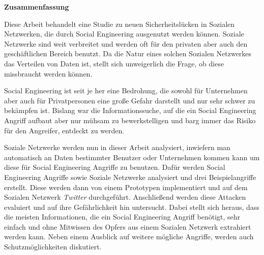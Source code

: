 
\clearemptydoublepage
{}
{}


\vspace*{2cm}
\begin{center}
{\Large \bf Zusammenfassung}
\end{center}
\vspace{1cm}

Diese Arbeit behandelt eine Studie zu neuen Sicherheitslücken in Sozialen
Netzwerken, die durch Social Engineering ausgenutzt werden können. Soziale
Netzwerke sind weit verbreitet und werden oft für den privaten aber auch den
geschäftlichen Bereich benutzt. Da die Natur eines solchen Sozialen Netzwerkes
das Verteilen von Daten ist, stellt sich unweigerlich die Frage, ob diese
missbraucht werden können.

Social Engineering ist seit je her eine Bedrohung, die sowohl für Unternehmen
aber auch für Privatpersonen eine große Gefahr darstellt und nur sehr schwer zu
bekämpfen ist. Bislang war die Informationssuche, auf die ein Social
Engineering Angriff aufbaut aber nur mühsam zu bewerkstelligen und barg immer
das Risiko für den Angreifer, entdeckt zu werden.

Soziale Netzwerke werden nun in dieser Arbeit analysiert, inwiefern man
automatisch an Daten bestimmter Benutzer oder Unternehmen kommen kann um diese für
Social Engineering Angriffe zu benutzen. Dafür werden Social Engineering
Angriffe sowie Soziale Netzwerke analysiert und drei Beispielangriffe erstellt.
Diese werden dann von einem Prototypen implementiert und auf dem Sozialen
Netzwerk \textit{Twitter} durchgeführt. Anschließend werden diese Attacken
evaluiert und auf ihre Gefährlichkeit hin untersucht. Dabei stellt sich heraus,
dass die meisten Informationen, die ein Social Engineering Angriff benötigt,
sehr einfach und ohne Mitwissen des Opfers aus einem Sozialen Netzwerk
extrahiert werden kann. Neben einem Ausblick auf weitere mögliche Angriffe, werden
auch Schutzmöglichkeiten diskutiert.

